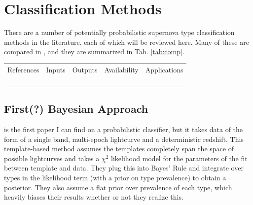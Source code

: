\documentclass[12pt, onecolumn]{emulateapj}
\newcommand{\textul}{\underline}
\begin{document}

\section{Classification Methods}

There are a number of potentially probabilistic supernova type classification methods in the literature, each of which will be reviewed here.  Many of these are compared in \citet{Kessler10}, and they are summarized in Tab. \ref{tab:comp}.  

\begin{tabular}{ccccc}
\label{tab:comp}
References&Inputs&Outputs&Availability&Applications\\
\citet{Kuznetsova06}&&&&\\
\citet{Poznanski06}&&&&\\
\citet{Rodney09, Rodney10}&&&&\\
\citet{Sako11}&&&&\citet{Sako14}\\
\end{tabular}

\subsection{First(?) Bayesian Approach}

\citet{Kuznetsova06} is the first paper I can find on a probabilistic classifier, but it takes data of the form of a single band, multi-epoch lightcurve and a deterministic redshift.  This template-based method assumes the templates completely span the space of possible lightcurves and takes a $\chi^{2}$ likelihood model for the parameters of the fit between template and data.  They plug this into Bayes' Rule and integrate over types in the likelihood term (with a prior on type prevalence) to obtain a posterior.  They also assume a flat prior over prevalence of each type, which heavily biases their results whether or not they realize this.
\end{document}
